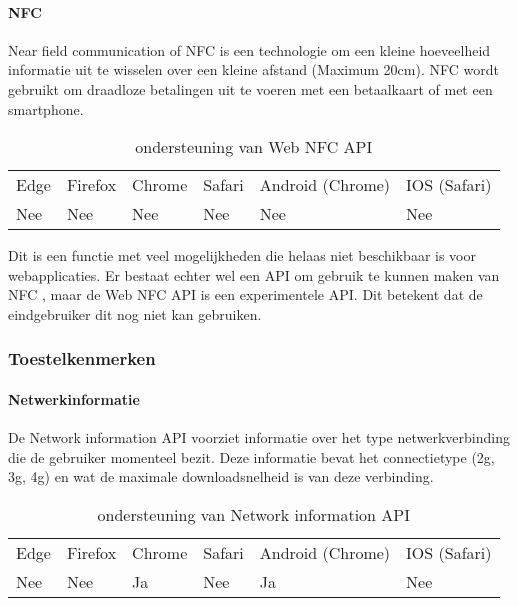 \paragraph{NFC}

Near field communication of NFC is een technologie om een kleine hoeveelheid informatie uit te wisselen over een kleine afstand (Maximum 20cm). NFC wordt gebruikt om draadloze betalingen uit te voeren met een betaalkaart of met een smartphone. 
\autocite{Paus2007}

\begin{table}[]
	\begin{tabular}{llllll}
		Edge & Firefox & Chrome & Safari & Android (Chrome) & IOS (Safari) \\
		Nee   & Nee      &  Nee     & Nee     & Nee               & Nee          
	\end{tabular}	
	\caption{ondersteuning van Web NFC API }
	\label{ondersteuning van Web NFC API}
\end{table}

Dit is een functie met veel mogelijkheden die helaas niet beschikbaar is voor webapplicaties.
Er bestaat echter wel een API om gebruik te kunnen maken van NFC \autocite{RohdeChristiansen2020}, maar de Web NFC API is een experimentele API. Dit betekent dat de eindgebruiker dit nog niet kan gebruiken.



\subsubsection{Toestelkenmerken}


\paragraph{Netwerkinformatie}

De Network information API \autocite{Lamouri2020} voorziet informatie over het type netwerkverbinding die de gebruiker momenteel bezit. Deze informatie bevat het connectietype (2g, 3g, 4g) en wat de maximale downloadsnelheid is van deze verbinding.

\begin{table}[]
	\begin{tabular}{llllll}
		Edge & Firefox & Chrome & Safari & Android (Chrome) & IOS (Safari) \\
		Nee   & Nee      &  Ja     & Nee     & Ja               & Nee          
	\end{tabular}	
	\caption{ondersteuning van Network information API }
	\label{ondersteuning van Network information API}
\end{table}

